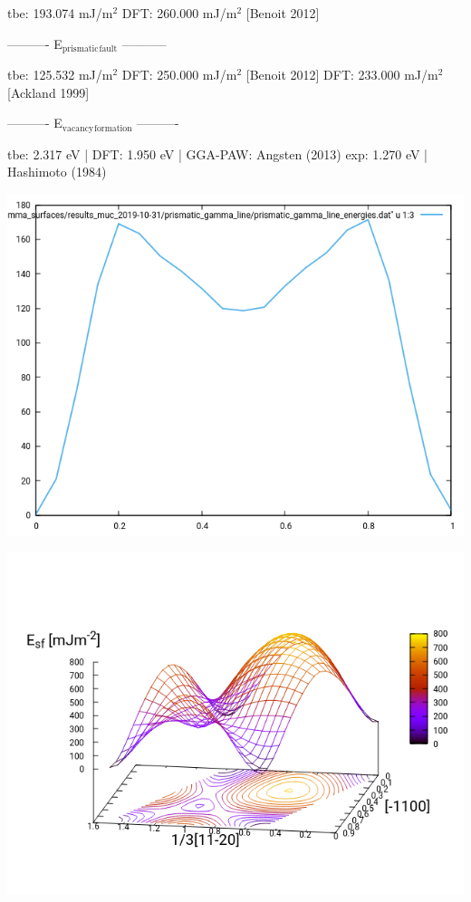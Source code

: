 \documentclass[11pt]{article}
\begin{document}
tbe:       193.074 mJ/m\(^{\text{2}}\)
DFT:       260.000 mJ/m\(^{\text{2}}\) [Benoit  2012]

----------     E\(_{\text{prismatic}}\)\(_{\text{fault}}\)     -----------

tbe:       125.532 mJ/m\(^{\text{2}}\)
DFT:       250.000 mJ/m\(^{\text{2}}\) [Benoit  2012]
DFT:       233.000 mJ/m\(^{\text{2}}\) [Ackland 1999]

----------     E\(_{\text{vacancy}}\)\(_{\text{formation}}\)     ----------

tbe:      2.317 eV  |
DFT:      1.950 eV  |  GGA-PAW: Angsten (2013) 
exp:      1.270 eV  |  Hashimoto (1984)


\begin{center}
\includegraphics[width=.9\linewidth]{Images/prismatic_gamma_line_2019-10-31_no_omega_ord_model.png}
\end{center}

\begin{center}
\includegraphics[width=.9\linewidth]{Images/basal_gs_noo_2019-10-29.png}
\end{center}
\end{document}
